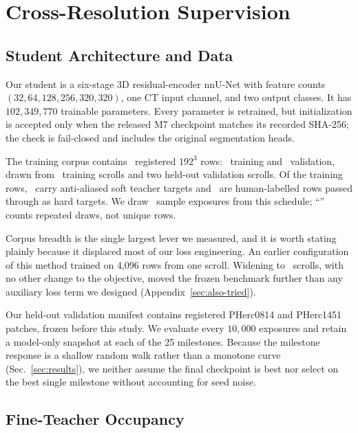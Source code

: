 \section{Cross-Resolution Supervision}
\label{sec:crossres}

\subsection{Student Architecture and Data}

Our student is a six-stage 3D residual-encoder nnU-Net with feature counts
$(32,64,128,256,320,320)$, one CT input channel, and two output classes.
It has $102{,}349{,}770$ trainable parameters.
Every parameter is retrained, but initialization is accepted only when the
released M7 checkpoint matches its recorded SHA-256; the check is fail-closed
and includes the original segmentation heads.

The training corpus contains \corpusRows\ registered $192^3$ rows:
\corpusTrain\ training and \corpusVal\ validation, drawn from \corpusScrolls\
training scrolls and two held-out validation scrolls.
Of the training rows, \corpusNative\ carry anti-aliased soft teacher targets
and \corpusHuman\ are human-labelled rows passed through as hard targets.
We draw \fzHorizon\ sample exposures from this schedule; ``\fzHorizon'' counts
repeated draws, not unique rows.

Corpus breadth is the single largest lever we measured, and it is worth stating
plainly because it displaced most of our loss engineering.
An earlier configuration of this method trained on 4,096 rows from one scroll.
Widening to \corpusScrolls\ scrolls, with no other change to the objective,
moved the frozen benchmark further than any auxiliary loss term we designed
(Appendix~\ref{sec:also-tried}).

Our held-out validation manifest contains registered PHerc0814 and PHerc1451
patches, frozen before this study. We evaluate every $10{,}000$ exposures and
retain a model-only snapshot at each of the 25 milestones. Because the
milestone response is a shallow random walk rather than a monotone curve
(Sec.~\ref{sec:results}), we neither assume the final checkpoint is best nor
select on the best single milestone without accounting for seed noise.

\subsection{Fine-Teacher Occupancy}

